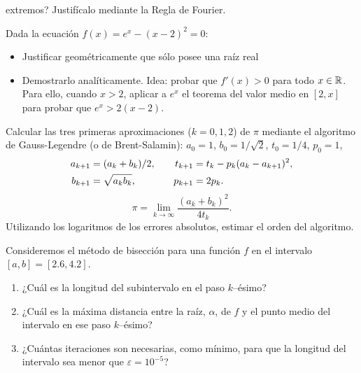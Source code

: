 \begin{problemas}
\begin{problema}
    extremos? Justifícalo mediante la Regla de Fourier.
  \end{problema}
  \begin{problema}
    Dada la ecuación $f(x)=e^x-(x-2)^2=0$:
    \begin{itemize}
    \item Justificar geométricamente que sólo posee una raíz real
    \item Demostrarlo analíticamente. Idea: probar que $f'(x)>0$ para
      todo $x\in\operatorname{{\mathbb R}}$. Para ello, cuando $x>2$, aplicar a $e^x$ el
      teorema del valor medio en $[2,x]$ para probar que $e^x>2(x-2)$.
    \end{itemize}
  \end{problema}
  \begin{problema}
    Calcular las tres primeras aproximaciones ($k=0,1,2$) de $\pi$
    mediante el algoritmo de Gauss-Legendre (o de Brent-Salamin):
    $a_0=1$, $b_0=1/\sqrt 2$, $t_0=1/4$, $p_0=1$,
    \begin{align*}
      a_{k+1}&=(a_{k}+b_{k})/2 , &\quad
      t_{k+1}&=t_k - p_k(a_k -a_{k+1})^2, \\
      b_{k+1}& =\sqrt{a_{k}\*b_{k}}, &\quad p_{k+1}&=2p_k.
    \end{align*}
    $$
    \pi = \lim_{k\to\infty} \frac{(a_k+b_k)^2}{4t_k}.
    $$
    Utilizando los logaritmos de los errores absolutos, estimar el
    orden del algoritmo.
  \end{problema}
  \begin{problema}
    Consideremos el método de bisección para
    una función $f$ en el intervalo $[a,b]=[2.6,4.2]$.
    \begin{enumerate}
    \item ¿Cuál es la longitud del subintervalo en el paso $k$--ésimo?
    \item ¿Cuál es la máxima distancia entre la raíz, $\alpha$, de $f$
      y el punto medio del intervalo en ese paso $k$--ésimo?
    \item ¿Cuántas iteraciones son necesarias, como mínimo, para que
      la longitud del intervalo sea menor que $\varepsilon=10^{-5}$?
    \end{enumerate}
  \end{problema}
\end{problemas}
